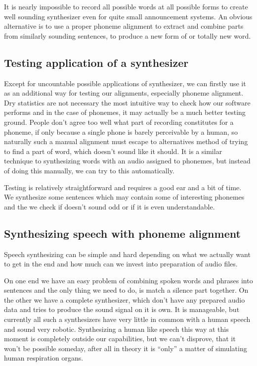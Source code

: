 \documentclass[12pt,a4paper,english]{article}
\begin{document}
It is nearly impossible to record all possible words at all possible forms to create well sounding synthesizer even for quite small announcement systems. An obvious alternative is to use a proper phoneme alignment to extract and combine parts from similarly sounding sentences, to produce a new form of or totally new word. \newline \newline

\subsection{Testing application of a synthesizer}

Except for uncountable possible applications of synthesizer, we can firstly use it as an additional way for testing our alignments, especially phoneme alignment. Dry statistics are not necessary the most intuitive way to check how our software performs and in the case of phonemes, it may actually be a much better testing ground. People don't agree too well what part of recording constitutes for a phoneme, if only because a single phone is barely perceivable by a human, so naturally such a manual alignment must escape to alternatives method of trying to find a part of word, which doesn't sound like it should. \newline
It is a similar technique to synthesizing words with an audio assigned to phonemes, but instead of doing this manually, we can try to this automatically. \newline

Testing is relatively straightforward and requires a good ear and a bit of time. We synthesize some sentences which may contain some of interesting phonemes and the we check if doesn't sound odd or if it is even understandable. 

\newpage
\subsection{Synthesizing speech with phoneme alignment}
Speech synthesizing can be simple and hard depending on what we actually want to get in the end and how much can we invest into preparation of audio files. \newline

On one end we have an easy problem of combining spoken words and phrases into sentences and the only thing we need to do, is match a silence part together. \newline
On the other we have a complete synthesizer, which don't have any prepared audio data and tries to produce the sound signal on it is own. It is manageable, but currently all such a synthesizers have very little in common with a human speech and sound very robotic. Synthesizing a human like speech this way at this moment is completely outside our capabilities, but we can't disprove, that it won't be possible someday, after all in theory it is “only” a matter of simulating human respiration organs. \newline
\end{document}
